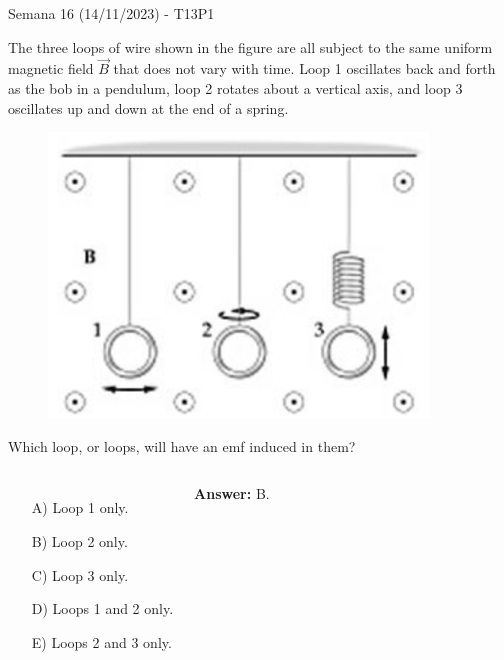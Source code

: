 \begin{frame}{Semana 16 (14/11/2023) - T13P1}
    
    The three loops of wire shown in the figure are all subject to the same uniform magnetic field $\vec{B}$ that does not vary with time. Loop 1 oscillates back and forth as the bob in a pendulum, loop 2 rotates about a vertical axis, and loop 3 oscillates up and down at the end of a spring.
    
    \begin{figure}
        \centering
        \includegraphics[scale=0.25]{figures/t11p1.png}
    \end{figure}
    
    Which loop, or loops, will have an emf induced in them?
    
    \begin{columns}
    \begin{itemize}
        \item[A)] Loop 1 only.
        \item[B)] Loop 2 only.
        \item[C)] Loop 3 only.
        \item[D)] Loops 1 and 2 only.
        \item[E)] Loops 2 and 3 only.
    \end{itemize}
    \pause \centering \textbf{Answer:} B.
    \end{columns}
    
\end{frame}

